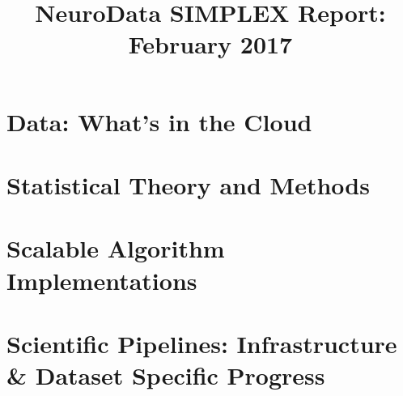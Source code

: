 \documentclass[12pt]{article}
\title{NeuroData SIMPLEX Report: February 2017}
\begin{document}

\newpage


\section{Data: What's in the Cloud}
\clearpage


\section{Statistical Theory and Methods}


%





%
%
%


\section{Scalable Algorithm Implementations}

%

%


\section{Scientific Pipelines: Infrastructure \& Dataset Specific
  Progress}


%







\end{document}

